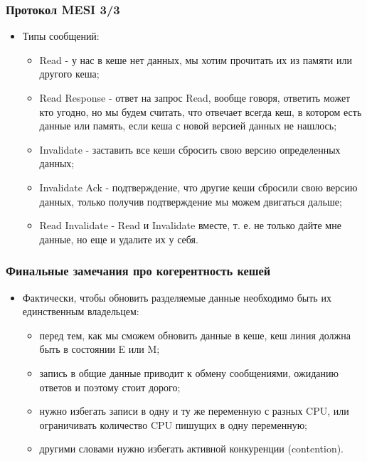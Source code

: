 \begin{frame}
\frametitle{Протокол MESI 3/3}
\begin{itemize}
  \item Типы сообщений:
  \begin{itemize}
    \item Read - у нас в кеше нет данных, мы хотим прочитать их из памяти или
    другого кеша;
    \item Read Response - ответ на запрос Read, вообще говоря, ответить может
    кто угодно, но мы будем считать, что отвечает всегда кеш, в котором есть
    данные или память, если кеша с новой версией данных не нашлось;
    \item Invalidate - заставить все кеши сбросить свою версию определенных
    данных;
    \item Invalidate Ack - подтверждение, что другие кеши сбросили свою версию
    данных, только получив подтверждение мы можем двигаться дальше;
    \item Read Invalidate - Read и Invalidate вместе, т. е. не только дайте мне
    данные, но еще и удалите их у себя.
  \end{itemize}
\end{itemize}
\end{frame}

\begin{frame}
\frametitle{Финальные замечания про когерентность кешей}
\begin{itemize}
  \item Фактически, чтобы обновить разделяемые данные необходимо быть их
  единственным владельцем:
  \begin{itemize}
    \item перед тем, как мы сможем обновить данные в кеше, кеш линия должна быть
    в состоянии E или M;
    \item запись в общие данные приводит к обмену сообщениями, ожиданию ответов
    и поэтому стоит дорого;
    \item нужно избегать записи в одну и ту же переменную с разных CPU, или
    ограничивать количество CPU пишущих в одну переменную;
    \item другими словами нужно избегать активной конкуренции (contention).
  \end{itemize}
\end{itemize}
\end{frame}
